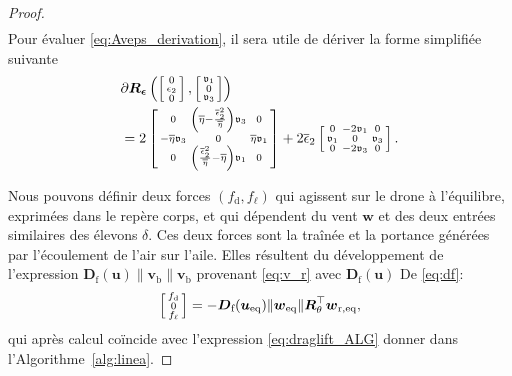\begin{proof}
\begin{align}
\end{align}
Pour évaluer \eqref{eq:Aveps_derivation}, il sera utile de dériver la forme simplifiée suivante
\begin{align}
\label{eq:diffRsparse}
    &\partial \boldsymbol{R}_{\boldsymbol{ \epsilon}} \left(
    \left[ \begin{smallmatrix}0 \\ \epsilon_2 \\ 0 \end{smallmatrix} \right]
    ,\left[ \begin{smallmatrix}\mathfrak{v}_1 \\ 0 \\ \mathfrak{v}_3 \end{smallmatrix} \right]\right) \nonumber \\ 
    & = 2  \left[ \begin{smallmatrix}0 & \left( \overline{\eta} - \frac{\overline \epsilon_{2}^{2}}{\overline{\eta}} \right) \mathfrak{v}_3 & 0\\
    -\overline{\eta} \mathfrak{v}_3 & 0 & \overline{\eta} \mathfrak{v}_1 \\
    0 & \left( \frac{\overline \epsilon_{2}^{2}}{\overline{\eta}} - \overline{\eta} \right) \mathfrak{v}_1 & 0 \end{smallmatrix} \right] + 2\overline \epsilon_{2}\left[ \begin{smallmatrix} 0 & -2\mathfrak{v}_1 & 0\\
    \mathfrak{v}_1 & 0 & \mathfrak{v}_3 \\
    0 & -2\mathfrak{v}_3 & 0 \end{smallmatrix} \right].
\end{align}

Nous pouvons définir deux forces $(f_{\text{d}} , f_{\ell})$ qui agissent sur le drone à l'équilibre, exprimées dans le repère corps, et qui dépendent du vent $\boldsymbol{w}$ et des deux entrées similaires des élevons $\delta$. Ces deux forces sont la traînée et la portance générées par l'écoulement de l'air sur l'aile. Elles résultent du développement de l'expression $ \boldsymbol{D}_{\text{f}}(\boldsymbol{u}) \lVert \boldsymbol{v}_{\text{b}} \rVert \boldsymbol{v}_{\text{b}}$ provenant \eqref{eq:v_r} avec $\boldsymbol{D}_{\text{f}}(\boldsymbol{u})$ De \eqref{eq:df}:
\begin{align}
\label{eq:draglift}
    \left[ \begin{smallmatrix}f_{\text{d}} \\ 0 \\ f_{\ell} \end{smallmatrix} \right] = - \boldsymbol{D}_{\text{f}}(\boldsymbol{u_{\text{eq}}}) \lVert \boldsymbol{w}_{\mathrm{eq}} \rVert  \boldsymbol{R}_\theta^\top \boldsymbol{w}_{\mathrm{r,eq}},
\end{align}
qui après calcul coïncide avec l'expression \eqref{eq:draglift_ALG} donner dans l'Algorithme~\ref{alg:linea}. 


\end{proof}
